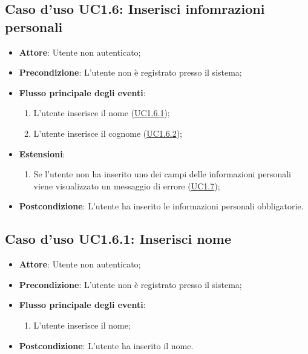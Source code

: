 \documentclass[12pt,a4paper]{article}
\begin{document}
\subsection{Caso d'uso UC1.6: Inserisci infomrazioni personali}

\begin{itemize}

\item \textbf{Attore}: Utente non autenticato; 
\item \textbf{Precondizione}: L'utente non è registrato presso il sistema;

\item \textbf{Flusso principale degli eventi}:
\begin{enumerate}
	\item L'utente inserisce il nome (\hyperlink{UC1.6.1}{UC1.6.1});
	\item L'utente inserisce il cognome (\hyperlink{UC1.6.2}{UC1.6.2});
	
\end{enumerate}
\item \textbf{Estensioni}:
\begin{enumerate}
	\item Se l'utente non ha inserito uno dei campi delle informazioni personali viene visualizzato un messaggio di errore (\hyperlink{UC1.7}{UC1.7});
	
\end{enumerate}
\item \textbf{Postcondizione}: L'utente ha inserito le informazioni personali obbligatorie.
\end{itemize}
\hypertarget{UC1.6.1}{}
\subsection{Caso d'uso UC1.6.1: Inserisci nome}

\begin{itemize}

\item \textbf{Attore}: Utente non autenticato; 
\item \textbf{Precondizione}: L’utente non è registrato presso il sistema;

\item \textbf{Flusso principale degli eventi}:
\begin{enumerate}
	\item L'utente inserisce il nome;
	
\end{enumerate}
\item \textbf{Postcondizione}: L'utente ha inserito il nome.
\end{itemize}
\hypertarget{UC1.6.2}{}
\end{document}
